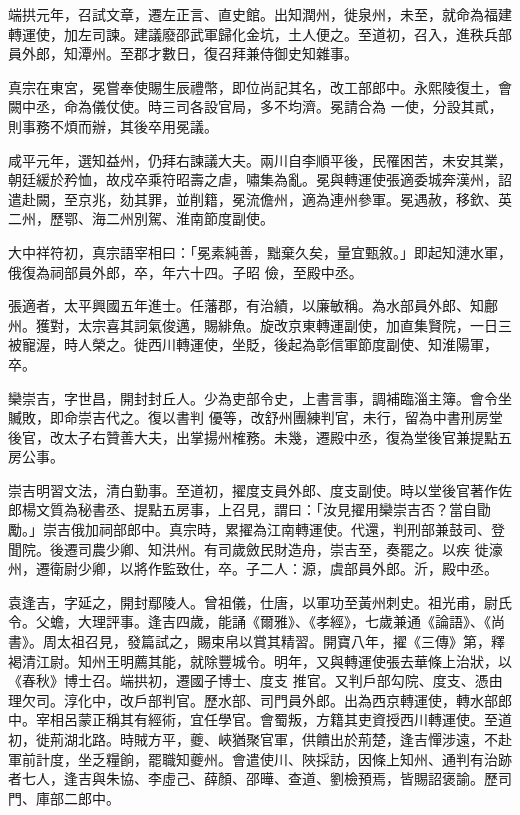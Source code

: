\begin{pinyinscope}
 端拱元年，召試文章，遷左正言、直史館。出知潤州，徙泉州，未至，就命為福建轉運使，加左司諫。建議廢邵武軍歸化金坑，土人便之。至道初，召入，進秩兵部員外郎，知潭州。至郡才數日，復召拜兼侍御史知雜事。



 真宗在東宮，冕嘗奉使賜生辰禮幣，即位尚記其名，改工部郎中。永熙陵復土，會闕中丞，命為儀仗使。時三司各設官局，多不均濟。冕請合為
 一使，分設其貳，則事務不煩而辦，其後卒用冕議。



 咸平元年，選知益州，仍拜右諫議大夫。兩川自李順平後，民罹困苦，未安其業，朝廷緩於矜恤，故戍卒乘符昭壽之虐，嘯集為亂。冕與轉運使張適委城奔漢州，詔遣赴闕，至京兆，劾其罪，並削籍，冕流儋州，適為連州參軍。冕遇赦，移欽、英二州，歷鄂、海二州別駕、淮南節度副使。



 大中祥符初，真宗語宰相曰：「冕素純善，黜棄久矣，量宜甄敘。」即起知漣水軍，俄復為祠部員外郎，卒，年六十四。子昭
 儉，至殿中丞。



 張適者，太平興國五年進士。任藩郡，有治績，以廉敏稱。為水部員外郎、知鄜州。獲對，太宗喜其詞氣俊邁，賜緋魚。旋改京東轉運副使，加直集賢院，一日三被寵渥，時人榮之。徙西川轉運使，坐貶，後起為彰信軍節度副使、知淮陽軍，卒。



 欒崇吉，字世昌，開封封丘人。少為吏部令史，上書言事，調補臨淄主簿。會令坐贓敗，即命崇吉代之。復以書判
 優等，改舒州團練判官，未行，留為中書刑房堂後官，改太子右贊善大夫，出掌揚州榷務。未幾，遷殿中丞，復為堂後官兼提點五房公事。



 崇吉明習文法，清白勤事。至道初，擢度支員外郎、度支副使。時以堂後官著作佐郎楊文質為秘書丞、提點五房事，上召見，謂曰：「汝見擢用欒崇吉否？當自勖勵。」崇吉俄加祠部郎中。真宗時，累擢為江南轉運使。代還，判刑部兼鼓司、登聞院。後遷司農少卿、知洪州。有司歲斂民財造舟，崇吉至，奏罷之。以疾
 徙濠州，遷衛尉少卿，以將作監致仕，卒。子二人：源，虞部員外郎。沂，殿中丞。



 袁逢吉，字延之，開封鄢陵人。曾祖儀，仕唐，以軍功至黃州刺史。祖光甫，尉氏令。父蟾，大理評事。逢吉四歲，能誦《爾雅》、《孝經》，七歲兼通《論語》、《尚書》。周太祖召見，發篇試之，賜束帛以賞其精習。開寶八年，擢《三傳》第，釋褐清江尉。知州王明薦其能，就除豐城令。明年，又與轉運使張去華條上治狀，以《春秋》博士召。端拱初，遷國子博士、度支
 推官。又判戶部勾院、度支、憑由理欠司。淳化中，改戶部判官。歷水部、司門員外郎。出為西京轉運使，轉水部郎中。宰相呂蒙正稱其有經術，宜任學官。會蜀叛，方籍其吏資授西川轉運使。至道初，徙荊湖北路。時賊方平，夔、峽猶聚官軍，供饋出於荊楚，逢吉憚涉遠，不赴軍前計度，坐乏糧餉，罷職知夔州。會遣使川、陜採訪，因條上知州、通判有治跡者七人，逢吉與朱協、李虛己、薛顏、邵曄、查道、劉檢預焉，皆賜詔褒諭。歷司門、庫部二郎中。




\end{pinyinscope}
